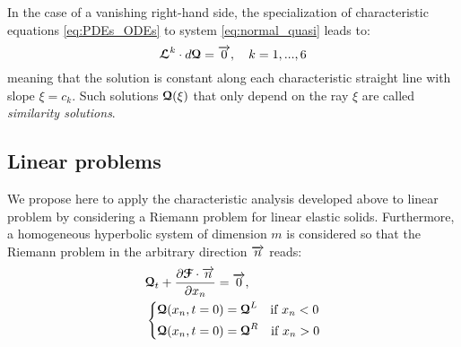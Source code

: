 \begin{remark}
  \label{rq:similarity_solution}
  In the case of a vanishing right-hand side, the specialization of characteristic equations \eqref{eq:PDEs_ODEs} to system \eqref{eq:normal_quasi} leads to:
\begin{equation}
  \label{eq:characteristic_equations_homogeneous}
  {\boldsymbol{\mathcal{L}}}^k \cdot d{\boldsymbol{\mathcal{Q}}} = {\overrightarrow{0}},\quad k=1,...,6
\end{equation}
meaning that the solution is constant along each characteristic straight line with slope $\xi = c_k$. Such solutions ${\boldsymbol{\mathcal{Q}}}(\xi)$ that only depend on the ray $\xi$ are called \textit{similarity solutions}.
\end{remark}

\subsection{Linear problems}
\label{subsec:charac_Linear_problems}
We propose here to apply the characteristic analysis developed above to linear problem by considering a Riemann problem for linear elastic solids. Furthermore, a homogeneous hyperbolic system of dimension $m$ is considered so that the Riemann problem in the arbitrary direction ${\overrightarrow{n}}$ reads:
\begin{equation}
  \label{eq:Linear_Riemann_problem}
  \begin{aligned}
  &{\boldsymbol{\mathcal{Q}}}_t + \frac{\partial {\boldsymbol{\mathcal{F}}}\cdot {\overrightarrow{n}}}{\partial x_n} = {\overrightarrow{0}}, \\
  &\left\lbrace 
    \begin{aligned}
      & {\boldsymbol{\mathcal{Q}}}(x_n,t=0) = {\boldsymbol{\mathcal{Q}}}^L \quad \text{if } x_n< 0\\
      & {\boldsymbol{\mathcal{Q}}}(x_n,t=0) = {\boldsymbol{\mathcal{Q}}}^R \quad \text{if } x_n> 0
    \end{aligned}
    \right.
  \end{aligned}
\end{equation}

